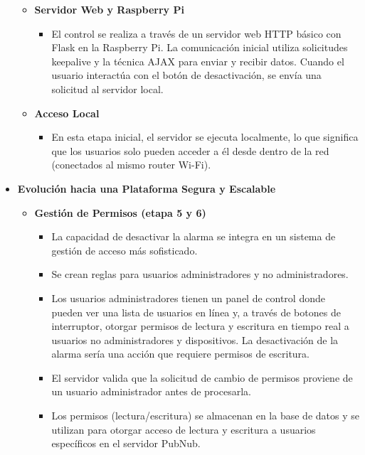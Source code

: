 \documentclass{report}
\begin{document}
\begin{itemize}
\begin{itemize}
        \item \textbf{Servidor Web y Raspberry Pi}
        \begin{itemize}
            \item El control se realiza a través de un servidor web HTTP básico con Flask en la Raspberry Pi. La comunicación inicial utiliza solicitudes
            keepalive y la técnica AJAX para enviar y recibir datos. Cuando el usuario interactúa con el botón de desactivación, se envía una solicitud 
            al servidor local.
        \end{itemize}

        \item \textbf{Acceso Local}
        \begin{itemize}
            \item En esta etapa inicial, el servidor se ejecuta localmente, lo que significa que los usuarios solo pueden acceder a él desde dentro de la 
            red (conectados al mismo router Wi-Fi).
        \end{itemize}
    \end{itemize}

    \item \textbf{Evolución hacia una Plataforma Segura y Escalable}
    \begin{itemize}

        \item \textbf{Gestión de Permisos (etapa 5 y 6)}
        \begin{itemize}
            \item La capacidad de desactivar la alarma se integra en un sistema de gestión de acceso más sofisticado.
            \item Se crean reglas para usuarios administradores y no administradores.
            \item Los usuarios administradores tienen un panel de control donde pueden ver una lista de usuarios en línea y, a través de botones de 
            interruptor, otorgar permisos de lectura y escritura en tiempo real a usuarios no administradores y dispositivos. La desactivación de la alarma 
            sería una acción que requiere permisos de escritura.
            \item El servidor valida que la solicitud de cambio de permisos proviene de un usuario administrador antes de procesarla.
            \item Los permisos (lectura/escritura) se almacenan en la base de datos y se utilizan para otorgar acceso de lectura y escritura a usuarios 
            específicos en el servidor PubNub.
        \end{itemize}


\end{itemize}
\end{itemize}
\end{document}
